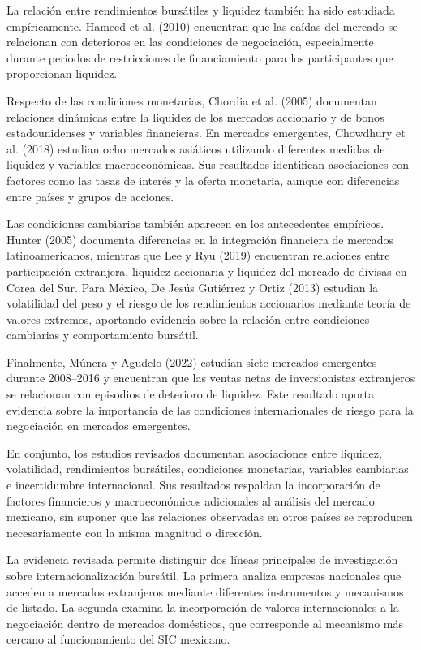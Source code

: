 La relación entre rendimientos bursátiles y liquidez también ha sido estudiada empíricamente. Hameed et al. (2010) encuentran que las caídas del mercado se relacionan con deterioros en las condiciones de negociación, especialmente durante periodos de restricciones de financiamiento para los participantes que proporcionan liquidez.

Respecto de las condiciones monetarias, Chordia et al. (2005) documentan relaciones dinámicas entre la liquidez de los mercados accionario y de bonos estadounidenses y variables financieras. En mercados emergentes, Chowdhury et al. (2018) estudian ocho mercados asiáticos utilizando diferentes medidas de liquidez y variables macroeconómicas. Sus resultados identifican asociaciones con factores como las tasas de interés y la oferta monetaria, aunque con diferencias entre países y grupos de acciones.

Las condiciones cambiarias también aparecen en los antecedentes empíricos. Hunter (2005) documenta diferencias en la integración financiera de mercados latinoamericanos, mientras que Lee y Ryu (2019) encuentran relaciones entre participación extranjera, liquidez accionaria y liquidez del mercado de divisas en Corea del Sur. Para México, De Jesús Gutiérrez y Ortiz (2013) estudian la volatilidad del peso y el riesgo de los rendimientos accionarios mediante teoría de valores extremos, aportando evidencia sobre la relación entre condiciones cambiarias y comportamiento bursátil.

Finalmente, Múnera y Agudelo (2022) estudian siete mercados emergentes durante 2008--2016 y encuentran que las ventas netas de inversionistas extranjeros se relacionan con episodios de deterioro de liquidez. Este resultado aporta evidencia sobre la importancia de las condiciones internacionales de riesgo para la negociación en mercados emergentes.

En conjunto, los estudios revisados documentan asociaciones entre liquidez, volatilidad, rendimientos bursátiles, condiciones monetarias, variables cambiarias e incertidumbre internacional. Sus resultados respaldan la incorporación de factores financieros y macroeconómicos adicionales al análisis del mercado mexicano, sin suponer que las relaciones observadas en otros países se reproducen necesariamente con la misma magnitud o dirección.


La evidencia revisada permite distinguir dos líneas principales de investigación sobre internacionalización bursátil. La primera analiza empresas nacionales que acceden a mercados extranjeros mediante diferentes instrumentos y mecanismos de listado. La segunda examina la incorporación de valores internacionales a la negociación dentro de mercados domésticos, que corresponde al mecanismo más cercano al funcionamiento del SIC mexicano.

